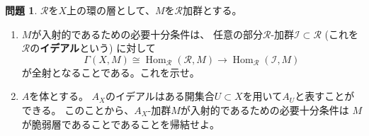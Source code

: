\documentclass[uplatex,dvipdfmx]{jsarticle}
\theoremstyle{definition}
\newtheorem{prob}[prob]{問題}
\DeclareMathOperator{\Hom}{\mathrm{Hom}}
\newcommand\mcI{\mathcal{I}}
\newcommand\mcR{\mathcal{R}}
\begin{document}
\begin{prob}\label{2.10}
  \(\mcR\)を\(X\)上の環の層として、\(M\)を\(\mcR\)加群とする。
  \begin{enumerate}
    \item \label{2.10.1}
    \(M\)が入射的であるための必要十分条件は、
    任意の部分\(\mcR\)-加群\(\mcI\subset \mcR\)
    (これを\(\mcR\)の\textbf{イデアル}という)
    に対して
    \[
    \Gamma(X,M) \cong \Hom_{\mcR}(\mcR,M)\to \Hom_{\mcR}(\mcI,M)
    \]
    が全射となることである。これを示せ。
    \item \label{2.10.2}
    \(A\)を体とする。
    \(A_X\)のイデアルはある開集合\(U\subset X\)を用いて\(A_U\)と表すことができる。
    このことから、\(A_X\)-加群\(M\)が入射的であるための必要十分条件は
    \(M\)が脆弱層であることであることを帰結せよ。
  \end{enumerate}
\end{prob}
\end{document}
